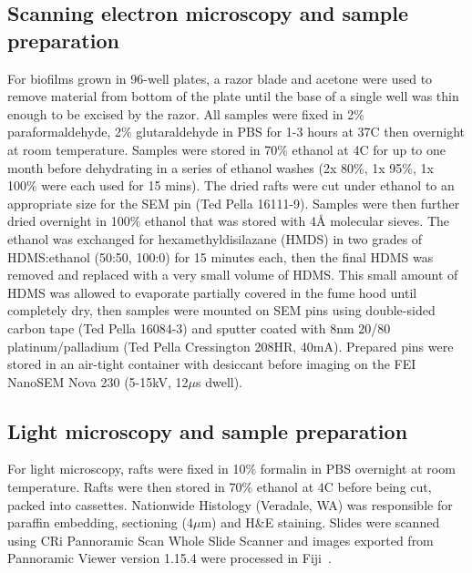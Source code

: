 \documentclass[10pt,letterpaper]{article}
\begin{document}
\subsection*{Scanning electron microscopy and sample preparation}
For biofilms grown in 96-well plates, a razor blade and acetone were used to remove material from bottom of the plate until the base of a single well was thin enough to be excised by the razor.
All samples were fixed in 2\% paraformaldehyde, 2\% glutaraldehyde in PBS for 1-3 hours at 37\degree C then overnight at room temperature.
Samples were stored in 70\% ethanol at 4\degree C for up to one month before dehydrating in a series of ethanol washes (2x 80\%, 1x 95\%, 1x 100\% were each used for 15 mins).
The dried rafts were cut under ethanol to an appropriate size for the SEM pin (Ted Pella 16111-9).
Samples were then further dried overnight in 100\% ethanol that was stored with 4\r{A} molecular sieves.
The ethanol was exchanged for hexamethyldisilazane (HMDS) in two grades of HDMS:ethanol (50:50, 100:0) for 15 minutes each, then the final HDMS was removed and replaced with a very small volume of HDMS.
This small amount of HDMS was allowed to evaporate partially covered in the fume hood until completely dry, then samples were mounted on SEM pins using double-sided carbon tape (Ted Pella 16084-3) and sputter coated with 8nm 20/80 platinum/palladium (Ted Pella Cressington 208HR, 40mA).
Prepared pins were stored in an air-tight container with desiccant before imaging on the FEI NanoSEM Nova 230 (5-15kV, 12$\mu$s dwell).

\subsection*{Light microscopy and sample preparation}
For light microscopy, rafts were fixed in 10\% formalin in PBS overnight at room temperature.
Rafts were then stored in 70\% ethanol at 4\degree C before being cut, packed into cassettes.
Nationwide Histology (Veradale, WA) was responsible for paraffin embedding, sectioning (4$\mu$m) and H\&E staining.
Slides were scanned using CRi Pannoramic Scan Whole Slide Scanner and images exported from Pannoramic Viewer version 1.15.4 were processed in Fiji~\cite{schindelin_fiji:_2012}.
\end{document}
